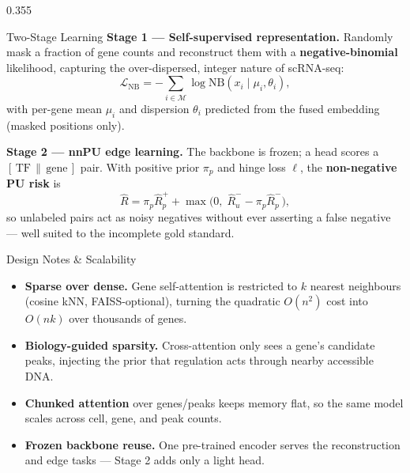\documentclass[final,25pt]{beamer}
\newcommand{\keyword}[1]{\textcolor{primary}{\bfseries #1}}
\begin{document}
\begin{frame}[t]
\begin{columns}[t]
\begin{column}{0.355\textwidth}
\begin{card}[accent]{Two-Stage Learning}
\textbf{\textcolor{primary}{Stage 1 — Self-supervised representation.}}
Randomly mask a fraction of gene counts and reconstruct them with a
\keyword{negative-binomial} likelihood, capturing the over-dispersed,
integer nature of scRNA-seq:
\vspace{-4pt}
\[
\mathcal{L}_{\text{NB}}=-\!\!\sum_{i\in\mathcal{M}}\!
\log \mathrm{NB}\!\left(x_i \mid \mu_i,\theta_i\right),
\]
with per-gene mean $\mu_i$ and dispersion $\theta_i$ predicted from the
fused embedding (masked positions only).

\vspace{12pt}
\textbf{\textcolor{accent}{Stage 2 — nnPU edge learning.}}
The backbone is frozen; a head scores a $[\,\text{TF}\,\|\,\text{gene}\,]$
pair. With positive prior $\pi_p$ and hinge loss $\ell$, the
\keyword{non-negative PU risk} is
\vspace{-4pt}
\[
\widehat{R}=\pi_p\widehat{R}^{+}_{p}
+\max\!\Big(0,\;\widehat{R}^{-}_{u}-\pi_p\widehat{R}^{-}_{p}\Big),
\]
so unlabeled pairs act as noisy negatives without ever asserting a false
negative — well suited to the incomplete gold standard.
\end{card}

\vspace{1.15cm}

\begin{card}[amber]{Design Notes \& Scalability}
  \small
  \begin{itemize}\setlength\itemsep{8pt}
    \item \keyword{Sparse over dense.} Gene self-attention is restricted to
          $k$ nearest neighbours (cosine kNN, FAISS-optional), turning the
          quadratic $O(n^2)$ cost into $O(nk)$ over thousands of genes.
    \item \keyword{Biology-guided sparsity.} Cross-attention only sees a
          gene's candidate peaks, injecting the prior that regulation acts
          through nearby accessible DNA.
    \item \keyword{Chunked attention} over genes/peaks keeps memory flat, so
          the same model scales across cell, gene, and peak counts.
    \item \keyword{Frozen backbone reuse.} One pre-trained encoder serves the
          reconstruction and edge tasks — Stage 2 adds only a light head.
  \end{itemize}
\end{card}


\end{column}
\end{columns}
\end{frame}
\end{document}
